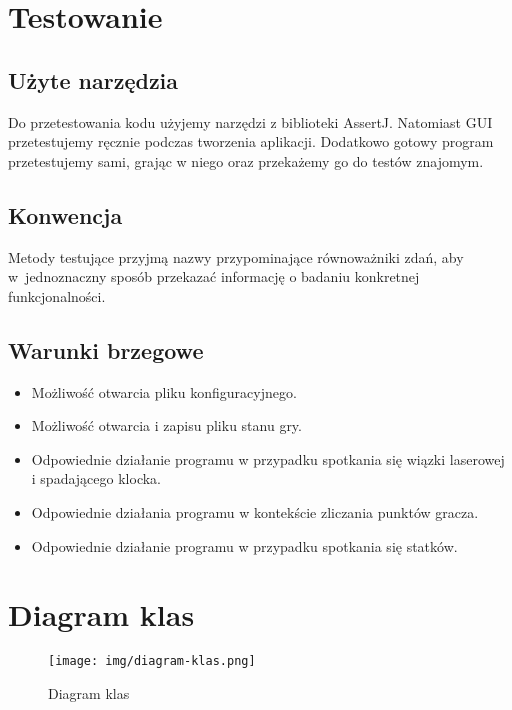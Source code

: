 \documentclass[a4paper]{article}
\begin{document}
\section{Testowanie}
\subsection{Użyte narzędzia}
Do przetestowania kodu użyjemy narzędzi z biblioteki AssertJ. Natomiast GUI przetestujemy ręcznie podczas tworzenia aplikacji. Dodatkowo gotowy program przetestujemy sami, grając w niego oraz przekażemy go do testów znajomym.

\subsection{Konwencja}
Metody testujące przyjmą nazwy przypominające równoważniki zdań, aby w~jednoznaczny sposób przekazać informację o badaniu konkretnej funkcjonalności.

\newpage

\subsection{Warunki brzegowe}
\begin{itemize}
    \item Możliwość otwarcia pliku konfiguracyjnego.
    \item Możliwość otwarcia i zapisu pliku stanu gry.
    \item Odpowiednie działanie programu w przypadku spotkania się wiązki laserowej i spadającego klocka.
    \item Odpowiednie działania programu w kontekście zliczania punktów gracza.
    \item Odpowiednie działanie programu w przypadku spotkania się statków.
\end{itemize}

\section{Diagram klas}
\begin{figure}[H]
    \centering
    \texttt{[image: img/diagram-klas.png]}
    \caption{Diagram klas}
    \label{fig:diagram}
\end{figure}
\label{end}
\end{document}
